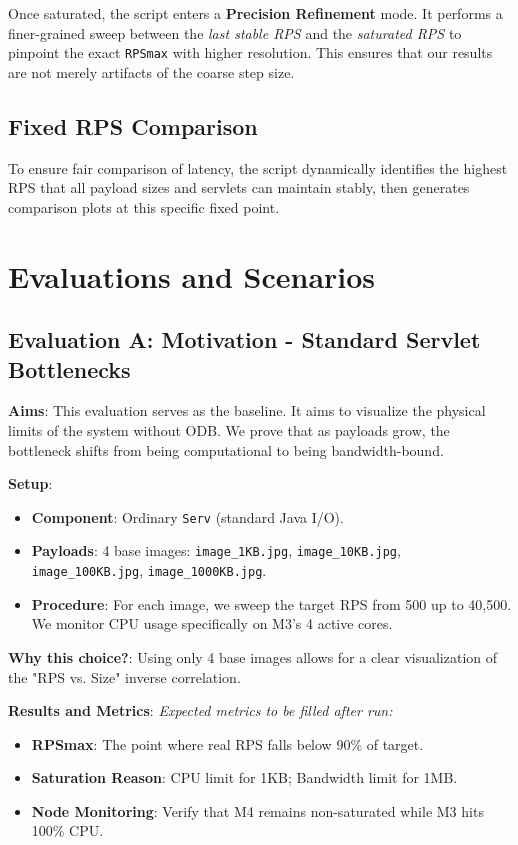\documentclass[a4paper,12pt]{article}
\begin{document}
Once saturated, the script enters a \textbf{Precision Refinement} mode. It performs a finer-grained sweep between the \textit{last stable RPS} and the \textit{saturated RPS} to pinpoint the exact \texttt{RPSmax} with higher resolution. This ensures that our results are not merely artifacts of the coarse step size.

\subsection{Fixed RPS Comparison}
To ensure fair comparison of latency, the script dynamically identifies the highest RPS that all payload sizes and servlets can maintain stably, then generates comparison plots at this specific fixed point.

\newpage
\section{Evaluations and Scenarios}

\subsection{Evaluation A: Motivation - Standard Servlet Bottlenecks}
\textbf{Aims}: This evaluation serves as the baseline. It aims to visualize the physical limits of the system without ODB. We prove that as payloads grow, the bottleneck shifts from being computational to being bandwidth-bound.

\textbf{Setup}:
\begin{itemize}
    \item \textbf{Component}: Ordinary \texttt{Serv} (standard Java I/O).
    \item \textbf{Payloads}: 4 base images: \texttt{image\_1KB.jpg}, \texttt{image\_10KB.jpg}, \texttt{image\_100KB.jpg}, \texttt{image\_1000KB.jpg}.
    \item \textbf{Procedure}: For each image, we sweep the target RPS from 500 up to 40,500. We monitor CPU usage specifically on M3's 4 active cores.
\end{itemize}

\textbf{Why this choice?}: Using only 4 base images allows for a clear visualization of the "RPS vs. Size" inverse correlation.

\textbf{Results and Metrics}:
\textit{Expected metrics to be filled after run:}
\begin{itemize}
    \item \textbf{RPSmax}: The point where real RPS falls below 90\% of target.
    \item \textbf{Saturation Reason}: CPU limit for 1KB; Bandwidth limit for 1MB.
    \item \textbf{Node Monitoring}: Verify that M4 remains non-saturated while M3 hits 100\% CPU.
\end{itemize}
\end{document}
